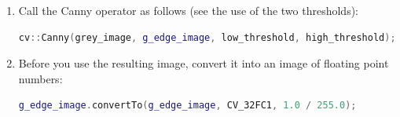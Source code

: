 \documentclass[english,a4paper,12pt,oneside]{article}
\begin{document}
\begin{itemize}
\begin{enumerate}
	\item Call the Canny operator as follows (see the use of the two thresholds):
         \begin{lstlisting}[language=c++]
cv::Canny(grey_image, g_edge_image, low_threshold, high_threshold);
	\end{lstlisting}

	\item Before you use the resulting image, convert it into an image of floating point numbers:
         \begin{lstlisting}[language=c++]
g_edge_image.convertTo(g_edge_image, CV_32FC1, 1.0 / 255.0);
	\end{lstlisting}

    \end{enumerate}

\end{itemize}



%
\end{document}
